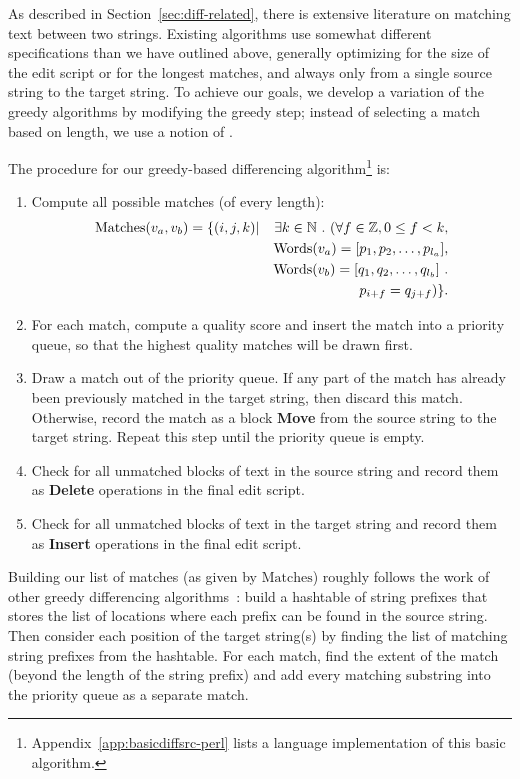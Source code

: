 As described in Section~\ref{sec:diff-related}, there is extensive
literature on matching text between two strings.
Existing algorithms use somewhat different specifications than
we have outlined above, generally optimizing for the size of the edit
script or for the longest matches, and always only from a single
source string to the target string.
To achieve our goals, we develop a variation of
the greedy algorithms
by modifying the greedy step; instead of selecting a match
based on length, we use a notion of .

The procedure for our greedy-based differencing
algorithm\footnote{Appendix~\ref{app:basicdiffsrc-perl} lists a
\perl language implementation of this basic algorithm.}
is:
\begin{enumerate}
\item Compute all possible matches (of every length):
\begin{eqnarray*}
\mathrm{Matches}(v_{a}, v_{b}) = \{ (i,j,k) & |
            & \exists k \in \mathbb{N} \ .\  (
    \forall f \in \mathbb{Z}, 0 \le f < k, \\
    & & \mathrm{Words}(v_{a}) = [ p_1, p_2, \ldots, p_{l_a} ], \\
    & & \mathrm{Words}(v_{b}) = [ q_1, q_2, \ldots, q_{l_b} ] \ . \\
    & & p_{i+f} = q_{j+f} ) \}.
\end{eqnarray*}

\item For each match, compute a quality score and insert the match into
    a priority queue, so that the highest quality matches will
    be drawn first.
\item Draw a match out of the priority queue.
    If any part of the match has already been previously matched
    in the target string, then discard this match.
    Otherwise, record the match as a block \textbf{Move}
    from the source string to the target string.
    Repeat this step until the priority queue is empty.
\item Check for all unmatched blocks of text in the source
    string and record them as \textbf{Delete} operations
    in the final edit script.
\item Check for all unmatched blocks of text in the target
    string and record them as \textbf{Insert} operations
    in the final edit script.
\end{enumerate}

Building our list of matches (as given by $\mathrm{Matches}$)
roughly follows the work of other greedy differencing
algorithms~\cite{Reichenberger1991,Burns1997}:
build a hashtable of string prefixes that stores the list
of locations where each prefix can be found in the source string.
Then consider each position of the target string(s) by finding
the list of matching string prefixes from the hashtable.
For each match, find the extent of the match
(beyond the length of the string prefix)
and add every matching substring into the priority queue
as a separate match.

